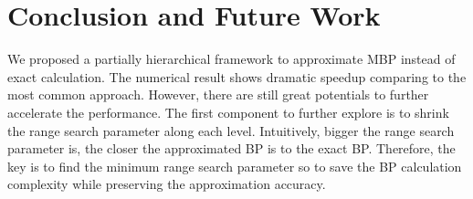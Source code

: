 % 

\section{Conclusion and Future Work}
We proposed a partially hierarchical framework to approximate MBP instead of exact calculation. The numerical result shows dramatic speedup comparing to the most common approach. However, there are still great potentials to further accelerate the performance. The first component to further explore is to shrink the range search parameter along each level. Intuitively, bigger the range search parameter is, the closer the approximated BP is to the exact BP. Therefore, the key is to find the minimum range search parameter so to save the BP calculation complexity while preserving the approximation accuracy. 

